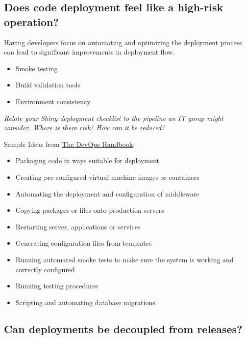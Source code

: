 \documentclass[]{book}
\providecommand{\tightlist}{%
  \setlength{\itemsep}{0pt}\setlength{\parskip}{0pt}}
\theoremstyle{definition}
\theoremstyle{definition}
\theoremstyle{definition}
\theoremstyle{remark}
\begin{document}
\hypertarget{does-code-deployment-feel-like-a-high-risk-operation}{%
\subsection{Does code deployment feel like a high-risk
operation?}\label{does-code-deployment-feel-like-a-high-risk-operation}}

Having developers focus on automating and optimizing the deployment
process can lead to significant improvements in deployment flow.

\begin{itemize}
\tightlist
\item
  Smoke testing
\item
  Build validation tools
\item
  Environment consistency
\end{itemize}

\emph{Relate your Shiny deployment checklist to the pipeline an IT group
might consider. Where is there risk? How can it be reduced?}

Sample Ideas from
\href{https://www.amazon.com/dp/1942788002/ref=cm_sw_r_tw_dp_U_x_bUwpCbBTAM8HQ}{The
DevOps Handbook}:

\begin{itemize}
\tightlist
\item
  Packaging code in ways suitable for deployment
\item
  Creating pre-configured virtual machine images or containers
\item
  Automating the deployment and configuration of middleware
\item
  Copying packages or files onto production servers
\item
  Restarting server, applications or services
\item
  Generating configuration files from templates
\item
  Running automated smoke tests to make sure the system is working and
  correctly configured
\item
  Running testing procedures
\item
  Scripting and automating database migrations
\end{itemize}

\hypertarget{can-deployments-be-decoupled-from-releases}{%
\subsection{Can deployments be decoupled from
releases?}\label{can-deployments-be-decoupled-from-releases}}
\end{document}
